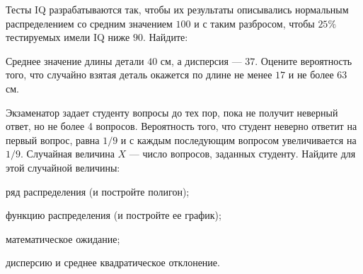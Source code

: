 \vfil

\begin{zkrPlain}{25}\noindent 
	Тесты IQ разрабатываются так, чтобы их результаты описывались нормальным распределением со средним значением $100$ и с таким разбросом, чтобы $25\%$ тестируемых имели IQ ниже $90$. Найдите: \par {}
 
\end{zkrPlain}

\vfil

\begin{zkrPlain}{25}\noindent 
	Среднее значение длины детали $ 40 $ см, а дисперсия --- $ 37 $. Оцените вероятность того, что случайно взятая деталь окажется по длине не менее $ 17 $ и не более $ 63 $ см.
 
\end{zkrPlain}

\newpage\setcounter{zad}{0}\setcounter{footnote}{0}



\begin{zkrPlain}{25}\noindent 
	Экзаменатор задает студенту вопросы до тех пор, пока не получит неверный ответ, но не более 4 вопросов. Вероятность того, что студент неверно ответит на первый вопрос, равна $1/9$ и с каждым последующим вопросом увеличивается на $1/9$. Случайная величина $X$ --- число вопросов, заданных студенту.  Найдите для этой случайной величины: \par \smallskip\small{ \par \zz ряд распределения (и постройте полигон); \par \zz функцию распределения (и постройте ее график); \par \zz математическое ожидание; \par \zz дисперсию и среднее квадратическое отклонение.\par \par}
 
\end{zkrPlain}

\vfil

